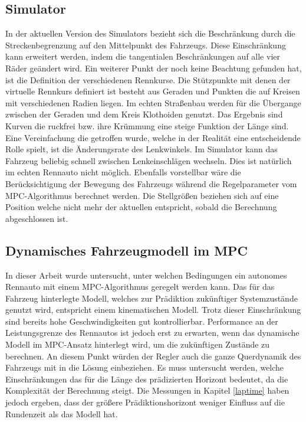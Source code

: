 \documentclass{like}
\begin{document}
\subsection{Simulator}
In der aktuellen Version des Simulators bezieht sich die Beschränkung durch die Streckenbegrenzung auf den Mittelpunkt des Fahrzeugs. Diese Einschränkung kann erweitert werden, indem die tangentialen Beschränkungen auf alle vier Räder geändert wird. Ein weiterer Punkt der noch keine Beachtung gefunden hat, ist die Definition der verschiedenen Rennkurse. Die Stützpunkte mit denen der virtuelle Rennkurs definiert ist besteht aus Geraden und Punkten die auf Kreisen mit verschiedenen Radien liegen. Im echten Straßenbau werden für die Übergange zwischen der Geraden und dem Kreis Klothoiden genutzt. Das Ergebnis sind Kurven die ruckfrei bzw. ihre Krümmung eine steige Funktion der Länge sind. \\
Eine Vereinfachung die getroffen wurde, welche in der Realität eine entscheidende Rolle spielt, ist die Änderungsrate des Lenkwinkels. Im Simulator kann das Fahrzeug beliebig schnell zwischen Lenkeinschlägen wechseln. Dies ist natürlich im echten Rennauto nicht möglich. Ebenfalls vorstellbar wäre die Berücksichtigung der Bewegung des Fahrzeugs während die Regelparameter vom \ac{MPC}-Algorithmus berechnet werden. Die Stellgrößen beziehen sich auf eine Position welche nicht mehr der aktuellen entspricht, sobald die Berechnung abgeschlossen ist.

\subsection{Dynamisches Fahrzeugmodell im MPC}
In dieser Arbeit wurde untersucht, unter welchen Bedingungen ein autonomes Rennauto mit einem \ac{MPC}-Algorithmus geregelt werden kann. Das für das Fahrzeug hinterlegte Modell, welches zur Prädiktion zukünftiger Systemzustände genutzt wird, entspricht einem kinematischen Modell. Trotz dieser Einschränkung sind bereits hohe Geschwindigkeiten gut kontrollierbar. Performance an der Leistungsgrenze des Rennautos ist jedoch erst zu erwarten, wenn das dynamische Modell im \ac{MPC}-Ansatz hinterlegt wird, um die zukünftigen Zustände zu berechnen. An diesem Punkt würden der Regler auch die ganze Querdynamik des Fahrzeugs mit in die Lösung einbeziehen. Es muss untersucht werden, welche Einschränkungen das für die Länge des prädizierten Horizont bedeutet, da die Komplexität der Berechnung steigt. Die Messungen in Kapitel \ref{laptime} haben jedoch ergeben, dass der größere Prädiktionshorizont weniger Einfluss auf die Rundenzeit als das Modell hat.
\end{document}
